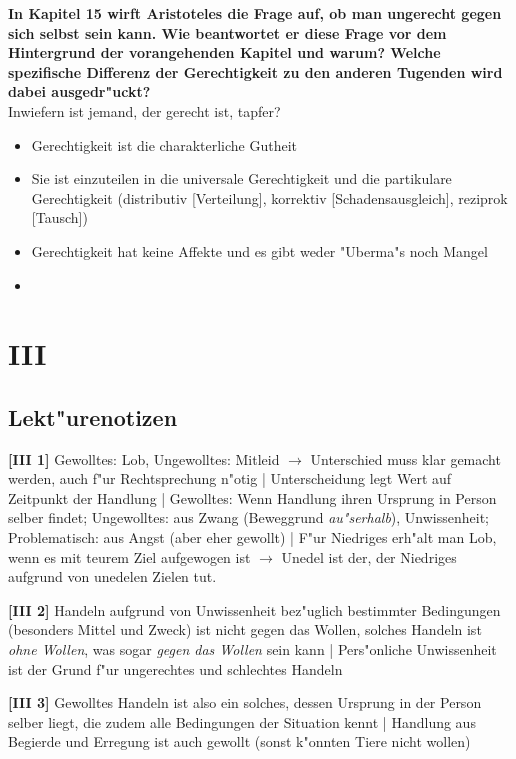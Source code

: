 \documentclass[emulatestandardclasses]{scrartcl}
\begin{document}
\noindent \textbf{In Kapitel 15 wirft Aristoteles die Frage auf, ob man ungerecht gegen sich selbst sein kann. Wie beantwortet er diese Frage vor dem Hintergrund der vorangehenden Kapitel und warum? Welche spezifische Differenz der Gerechtigkeit zu den anderen Tugenden wird dabei ausgedr"uckt?}\\

Inwiefern ist jemand, der gerecht ist, tapfer?

\begin{itemize}
  \item Gerechtigkeit ist die charakterliche Gutheit
  \item Sie ist einzuteilen in die universale Gerechtigkeit und die partikulare Gerechtigkeit (distributiv [Verteilung], korrektiv [Schadensausgleich], reziprok [Tausch])
  \item Gerechtigkeit hat keine Affekte und es gibt weder "Uberma"s noch Mangel
  \item 
\end{itemize}

\section{III}

\subsection{Lekt"urenotizen}

\textbf{[III 1]} Gewolltes: Lob, Ungewolltes: Mitleid $\rightarrow$ Unterschied muss klar gemacht werden, auch f"ur Rechtsprechung n"otig | Unterscheidung legt Wert auf Zeitpunkt der Handlung | Gewolltes: Wenn Handlung ihren Ursprung in Person selber findet; Ungewolltes: aus Zwang (Beweggrund \emph{au"serhalb}), Unwissenheit; Problematisch: aus Angst (aber eher gewollt) | F"ur Niedriges erh"alt man Lob, wenn es mit teurem Ziel aufgewogen ist $\rightarrow$ Unedel ist der, der Niedriges aufgrund von unedelen Zielen tut.\newline

\noindent \textbf{[III 2]} Handeln aufgrund von Unwissenheit bez"uglich bestimmter Bedingungen (besonders Mittel und Zweck) ist nicht gegen das Wollen, solches Handeln ist \emph{ohne Wollen}, was sogar \emph{gegen das Wollen} sein kann | Pers"onliche Unwissenheit ist der Grund f"ur ungerechtes und schlechtes Handeln \newline

\noindent \textbf{[III 3]} Gewolltes Handeln ist also ein solches, dessen Ursprung in der Person selber liegt, die zudem alle Bedingungen der Situation kennt | Handlung aus Begierde und Erregung ist auch gewollt (sonst k"onnten Tiere nicht wollen)\newline
\end{document}
